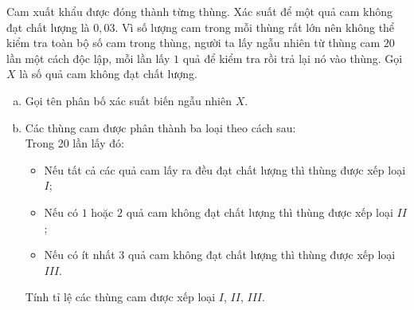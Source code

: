 \begin{bt}%

	Cam xuất khẩu được đóng thành từng thùng. Xác suất để một quả cam không đạt chất lượng là $0{,}03$. Vì số lượng cam trong mỗi thùng rất lớn nên không thể kiểm tra toàn bộ số cam trong thùng, người ta lấy ngẫu nhiên từ thùng cam $20$ lần một cách độc lập, mỗi lần lấy $1$ quả để kiểm tra rồi trả lại nó vào thùng. Gọi $X$ là số quả cam không đạt chất lượng.
	\begin{enumerate}[a)]
		\item Gọi tên phân bố xác suất biến ngẫu nhiên $X$.
		\item Các thùng cam được phân thành ba loại theo cách sau:\\
		Trong 20 lần lấy đó:
		\begin{itemize}
			\item Nếu tất cả các quả cam lấy ra đều đạt chất lượng thì thùng được xếp loại $I$;
			\item Nếu có $1$ hoặc $2$ quả cam không đạt chất lượng thì thùng được xếp loại $II$;
			\item Nếu có ít nhất $3$ quả cam không đạt chất lượng thì thùng được xếp loại $III$.
		\end{itemize}
		Tính tỉ lệ các thùng cam được xếp loại $I$, $II$, $III$.
	\end{enumerate}
\end{bt}

